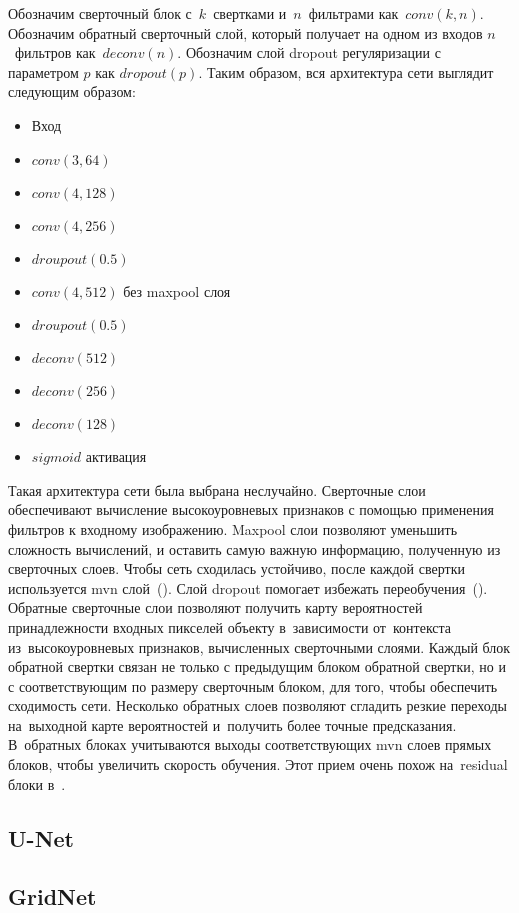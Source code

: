 Обозначим сверточный блок с~$k$~свертками и~$n$~фильтрами как~$conv(k,n)$. Обозначим обратный сверточный слой, который получает на одном из входов $n$~фильтров как~$deconv(n)$. Обозначим слой dropout регуляризации с параметром $p$ как $dropout(p)$. Таким образом, вся архитектура сети выглядит следующим образом:

\begin{itemize}
  \item Вход
  \item $conv(3,64)$
  \item $conv(4,128)$
  \item $conv(4,256)$
  \item $droupout(0.5)$
  \item $conv(4,512)$ без maxpool слоя
  \item $droupout(0.5)$
  \item $deconv(512)$
  \item $deconv(256)$
  \item $deconv(128)$
  \item $sigmoid$ активация
\end{itemize}

Такая архитектура сети была выбрана неслучайно. Сверточные слои обеспечивают вычисление высокоуровневых признаков с помощью применения фильтров к входному изображению. Maxpool слои позволяют уменьшить сложность вычислений, и оставить самую важную информацию, полученную из сверточных слоев. Чтобы сеть сходилась устойчиво, после каждой свертки используется mvn слой~(\cite{batch_norm}). Слой dropout помогает избежать переобучения~(\cite{dropout}). Обратные сверточные слои позволяют получить карту вероятностей принадлежности входных пикселей объекту в~зависимости от~контекста из~высокоуровневых признаков, вычисленных сверточными слоями. Каждый блок обратной свертки связан не только с предыдущим блоком обратной свертки, но и с соответствующим по размеру сверточным блоком, для того, чтобы обеспечить сходимость сети. Несколько обратных слоев позволяют сгладить резкие переходы на~выходной карте вероятностей и~получить более точные предсказания. В~обратных блоках учитываются выходы соответствующих mvn слоев прямых блоков, чтобы увеличить скорость обучения. Этот прием очень похож на~residual блоки в~\cite{resnet}.

\subsection{U-Net}

\subsection{GridNet}
